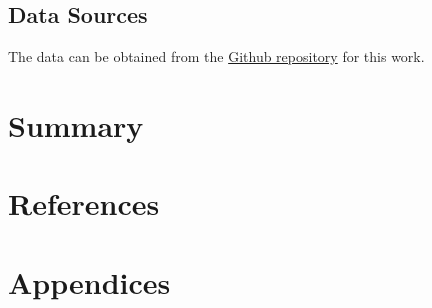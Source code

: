 \documentclass{article}
\begin{document}
\subsection{Data Sources}
The data can be obtained from the \href{}{Github repository} for this work. 
	
	
\section{Summary}

\section{References}	
	
\section{Appendices}


\end{document}

